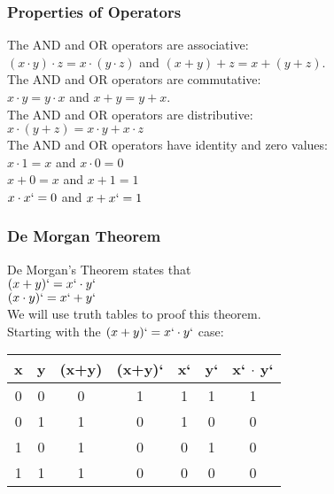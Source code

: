 \documentclass[]{article}
\begin{document}
\subsubsection{Properties of Operators}
\bigbreak

The AND and OR operators are associative: \\
$(x \cdot y) \cdot z = x \cdot (y \cdot z)$ and $(x + y) + z = x + (y + z)$.\\

The AND and OR operators are commutative: \\
$x \cdot y = y \cdot x$ and $x + y = y + x$.\\

The AND and OR operators are distributive: \\
$x \cdot (y + z) = x \cdot y + x \cdot z$\\


The AND and OR operators have identity and zero values: \\
$x \cdot 1 = x$ and $x \cdot 0 = 0$\\
$x + 0 = x$ and $x + 1 = 1$\\
$x \cdot x` = 0$ and $x + x` = 1$\\


\subsubsection{De Morgan Theorem}
\bigbreak

De Morgan's Theorem states that\\

$(x + y)` = x` \cdot y`$\\
$(x \cdot y)` = x` + y`$\\

We will use truth tables to proof this theorem.\\

Starting with the $(x + y)` = x` \cdot y`$ case:\\

\begin{center}
	\begin{tabular}{|c|c|c|c|c|c|c|}
		x & y & (x+y) & (x+y)` & x` & y` & x` $\cdot$ y` \\\hline
		0 & 0 & 0 & 1 & 1 & 1 & 1 \\
		0 & 1 & 1 & 0 & 1 & 0 & 0 \\
		1 & 0 & 1 & 0 & 0 & 1 & 0 \\
		1 & 1 & 1 & 0 & 0 & 0 & 0 \\
	\end{tabular}
	\bigbreak
\end{center}
\end{document}
